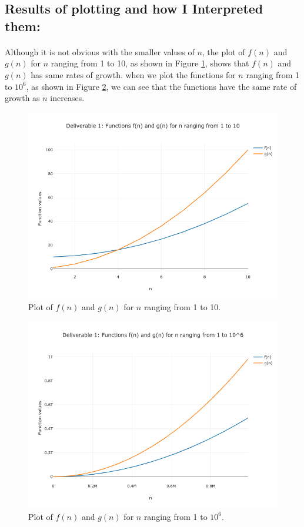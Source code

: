 \documentclass{article}
\begin{document}
\subsection{Results of plotting and how I Interpreted them: }
\paragraph{} Although it is not obvious with the smaller values of \(n\), 
the plot of \(f(n)\) and \(g(n)\) for \(n\) ranging 
from 1 to 10, as shown in Figure \ref{del1: plot_1_to_10}, 
shows that \(f(n)\) and \(g(n)\) has same rates of growth.  
when we plot the functions for \(n\) ranging from 1 to \(10^6\), as shown in Figure \ref{del1: plot_1_to10^6}, we can see that
the functions have the same rate of growth as \(n\) increases. 
\begin{figure}[H]
    \centering
    \includegraphics[width=\textwidth]{Deliverable 1: plot_1_to_10.png}
    \caption{Plot of $f(n)$ and $g(n)$ for $n$ ranging from 1 to 10.}
    \label{del1: plot_1_to_10}
\end{figure}

\begin{figure}[H]
    \centering
    \includegraphics[width=\textwidth]{Deliverable 1: plot_1_to_1000000.png}
    \caption{Plot of $f(n)$ and $g(n)$ for $n$ ranging from 1 to $10^6$.}
    \label{del1: plot_1_to10^6}
\end{figure}
\end{document}
